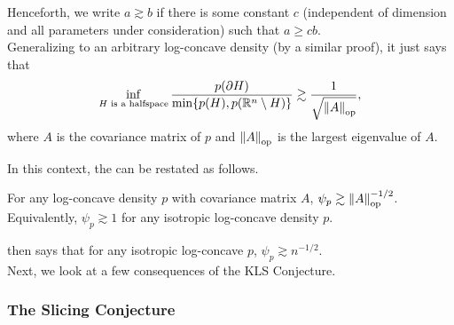 	Henceforth, we write $a\gtrsim b$ if there is some constant $c$ (independent of dimension and all parameters under consideration) such that $a \geq c b$.\\
	Generalizing  to an arbitrary log-concave density (by a similar proof), it just says that
	\[ \inf_{H\text{ is a halfspace}} \frac{p(\partial H)}{\min\{p(H),p(\mathbb{R}^n\setminus H)\}} \gtrsim \frac{1}{\sqrt{\left\lVert A\right\rVert_{\text{op}}}}, \]
	where $A$ is the covariance matrix of $p$ and $\left\lVert A\right\rVert_{\text{op}}$ is the largest eigenvalue of $A$.

	In this context, the  can be restated as follows. 

	\begin{fcon}
		\label{con: kls conjecture reformulated}
		For any log-concave density $p$ with covariance matrix $A$, $\psi_p \gtrsim \left\lVert A\right\rVert_{\text{op}}^{-1/2}$. Equivalently, $\psi_p\gtrsim 1$ for any isotropic log-concave density $p$.
	\end{fcon}

	 then says that for any isotropic log-concave $p$, $\psi_p \gtrsim n^{-1/2}$.\\





	Next, we look at a few consequences of the KLS Conjecture.

	\subsubsection{The Slicing Conjecture}

